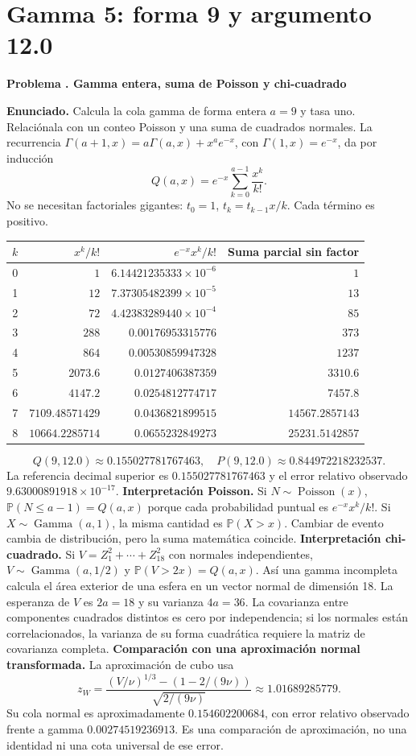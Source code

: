 \documentclass[11pt,a4paper]{article}
\newcommand{\Prob}{\mathbb P}
\theoremstyle{definition}
\newcounter{problema}
\newenvironment{resuelto}[1]{\refstepcounter{problema}\par\medskip\Needspace{6\baselineskip}\textbf{Problema \theproblema. #1}\par}{\par\medskip}
\begin{document}
\section{Gamma 5: forma 9 y argumento 12.0}
\begin{resuelto}{Gamma entera, suma de Poisson y chi-cuadrado}
\textbf{Enunciado.} Calcula la cola gamma de forma entera $a=9$ y tasa uno. Relaciónala con un conteo Poisson y una suma de cuadrados normales.
La recurrencia $\Gamma(a+1,x)=a\Gamma(a,x)+x^ae^{-x}$, con $\Gamma(1,x)=e^{-x}$, da por inducción
\[
Q(a,x)=e^{-x}\sum_{k=0}^{a-1}\frac{x^k}{k!}.
\]
No se necesitan factoriales gigantes: $t_0=1$, $t_k=t_{k-1}x/k$. Cada término es positivo.

\begin{center}\small\begin{tabular}{rrrr}
\toprule
$k$&$x^k/k!$&$e^{-x}x^k/k!$&Suma parcial sin factor\\
\midrule
0&$1$&$6.14421235333\times10^{-6}$&$1$\\
1&$12$&$7.37305482399\times10^{-5}$&$13$\\
2&$72$&$4.42383289440\times10^{-4}$&$85$\\
3&$288$&$0.00176953315776$&$373$\\
4&$864$&$0.00530859947328$&$1237$\\
5&$2073.6$&$0.0127406387359$&$3310.6$\\
6&$4147.2$&$0.0254812774717$&$7457.8$\\
7&$7109.48571429$&$0.0436821899515$&$14567.2857143$\\
8&$10664.2285714$&$0.0655232849273$&$25231.5142857$\\
\bottomrule\end{tabular}\end{center}
\[
Q(9,12.0)\approx0.155027781767463,\quad
P(9,12.0)\approx0.844972218232537.
\]
La referencia decimal superior es $0.155027781767463$ y el error relativo observado $9.63000891918\times10^{-17}$.
\textbf{Interpretación Poisson.} Si $N\sim\operatorname{Poisson}(x)$, $\Prob(N\le a-1)=Q(a,x)$ porque cada probabilidad puntual es $e^{-x}x^k/k!$. Si $X\sim\operatorname{Gamma}(a,1)$, la misma cantidad es $\Prob(X>x)$. Cambiar de evento cambia de distribución, pero la suma matemática coincide.
\textbf{Interpretación chi-cuadrado.} Si $V=Z_1^2+\cdots+Z_{18}^2$ con normales independientes, $V\sim\operatorname{Gamma}(a,1/2)$ y $\Prob(V>2x)=Q(a,x)$. Así una gamma incompleta calcula el área exterior de una esfera en un vector normal de dimensión 18.
La esperanza de $V$ es $2a=18$ y su varianza $4a=36$. La covarianza entre componentes cuadrados distintos es cero por independencia; si los normales están correlacionados, la varianza de su forma cuadrática requiere la matriz de covarianza completa.
\textbf{Comparación con una aproximación normal transformada.} La aproximación de cubo usa
\[
z_W=\frac{(V/\nu)^{1/3}-(1-2/(9\nu))}{\sqrt{2/(9\nu)}}\approx1.01689285779.
\]
Su cola normal es aproximadamente $0.154602200684$, con error relativo observado frente a gamma $0.00274519236913$. Es una comparación de aproximación, no una identidad ni una cota universal de ese error.
\end{resuelto}
\end{document}
